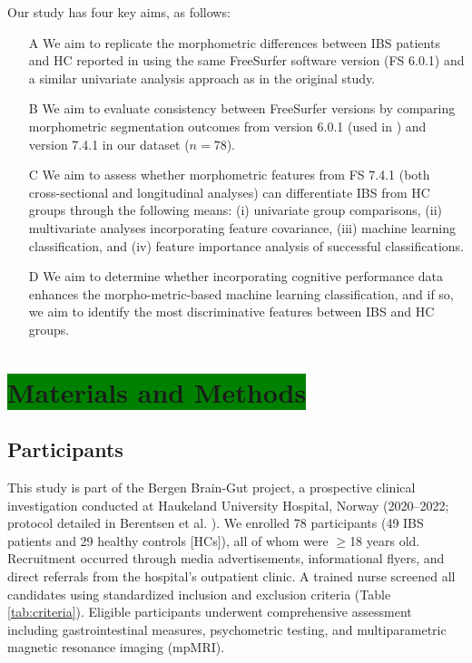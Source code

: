 \documentclass[diagnostics,article,accept,pdftex,moreauthors]{Definitions/mdpi}
\newcommand{\highlight}[1]{\colorbox{green}{#1}}
\begin{document}
 Our study has four key aims, as follows:

\begin{itemize}
\item[A] We aim to replicate the morphometric differences between IBS patients and HC reported in \cite{Skrobisz2022} using the same FreeSurfer software version (FS 6.0.1) and a similar univariate analysis approach as in the original study.
\item[B] We aim to evaluate consistency between FreeSurfer versions by comparing morphometric segmentation outcomes from version 6.0.1 (used in \cite{Skrobisz2022}) and version 7.4.1 in our dataset ($n=78$).
\item[C] We aim to assess whether morphometric features from FS 7.4.1 (both cross-sectional and longitudinal analyses) can differentiate IBS from HC groups through the following means: (i) univariate group comparisons, (ii) multivariate analyses incorporating feature covariance, (iii) machine learning classification, and (iv) feature importance analysis of successful classifications.   
\item[D] We aim to determine whether incorporating cognitive performance data enhances the morpho-metric-based machine learning classification, and if so, we aim to identify the most discriminative features between IBS and HC groups. 
\end{itemize}



\section{\highlight{Materials and Methods}%
}

\subsection{Participants}
This study is part of the Bergen Brain-Gut project, a prospective clinical investigation conducted at Haukeland University Hospital, Norway (2020--2022; protocol detailed in Berentsen et al. \cite{berentsen2020study}). We enrolled 78 participants (49 IBS patients and 29 healthy controls [HCs]), all of whom were $\geq$18 years old. Recruitment occurred through media advertisements, informational flyers, and direct referrals from the hospital's outpatient clinic. A trained nurse screened all candidates using standardized inclusion and exclusion criteria (Table \ref{tab:criteria}). Eligible participants underwent comprehensive assessment including gastrointestinal measures, psychometric testing, and multiparametric magnetic resonance imaging (mpMRI).
\end{document}
